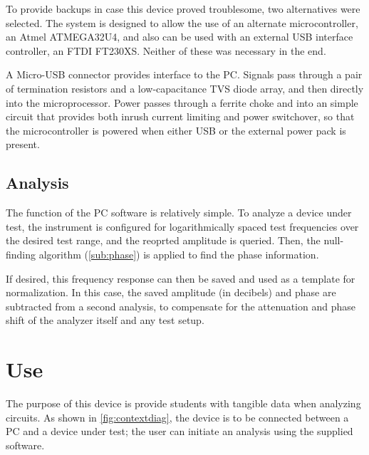To provide backups in case this device proved troublesome, two alternatives were
selected. The system is designed to allow the use of an alternate microcontroller,
an Atmel ATMEGA32U4, and also can be used with an external USB interface controller,
an FTDI FT230XS. Neither of these was necessary in the end.

A Micro-USB connector provides interface to the PC. Signals pass through a pair of
termination resistors and a low-capacitance TVS diode array, and then directly into
the microprocessor. Power passes through a ferrite choke and into an simple circuit
that provides both inrush current limiting and power switchover, so that the
microcontroller is powered when either USB or the external power pack is present.

\subsection{Analysis}

The function of the PC software is relatively simple. To analyze a device under
test, the instrument is configured for logarithmically spaced test frequencies
over the desired test range, and the reoprted amplitude is queried. Then, the
null-finding algorithm (\autoref{sub:phase}) is applied to find the phase information.

If desired, this frequency response can then be saved and used as a template for
normalization. In this case, the saved amplitude (in decibels) and phase are subtracted
from a second analysis, to compensate for the attenuation and phase shift of the
analyzer itself and any test setup.

\section{Use}
The purpose of this device is provide students with tangible data when analyzing
circuits. As shown in \autoref{fig:contextdiag}, the device is to be connected between
a PC and a device under test; the user can initiate an analysis using the supplied software.
